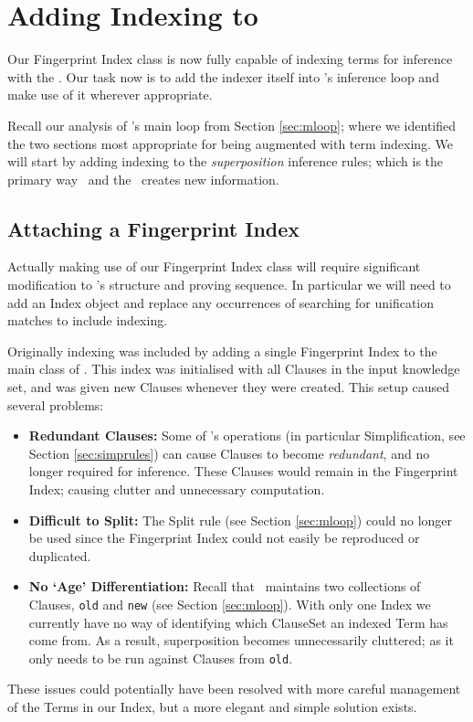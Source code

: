 \section{Adding Indexing to \Beagle}
Our Fingerprint Index class is now fully capable of indexing terms for inference
with the \HSWAC. Our task now is to add the indexer itself into \beagle's inference
loop and make use of it wherever appropriate.

Recall our analysis of \beagle's main loop from Section \ref{sec:mloop}; where we identified
the two sections most appropriate for being augmented with term indexing. We will
start by adding indexing to the \emph{superposition} inference rules; which is
the primary way \beagle\ and the \HSWAC\ creates new information.

\subsection{Attaching a Fingerprint Index}

Actually making use of our Fingerprint Index class will require significant modification
to \beagle's structure and proving sequence. In particular we will need
to add an Index object and replace any occurrences of searching for unification matches
to include indexing.

Originally indexing was included by adding a single Fingerprint Index to the main
class of \beagle. This index was initialised with all Clauses in the input knowledge set,
and was given new Clauses whenever they were created. This setup caused several
problems:
\begin{itemize}
\item \textbf{Redundant Clauses:} Some of \Beagle's operations (in particular Simplification, see Section \ref{sec:simprules})
can cause Clauses to become \emph{redundant}, and no longer required for inference.
These Clauses would remain in the Fingerprint Index; causing clutter and unnecessary
computation.
\item \textbf{Difficult to Split:} The Split rule (see Section \ref{sec:mloop})
could no longer be used since the Fingerprint Index could not easily be reproduced or
duplicated.
\item \textbf{No `Age' Differentiation:} Recall that \beagle\ maintains
two collections of Clauses, \verb!old! and \verb!new! (see Section \ref{sec:mloop}).
With only one Index we currently have no way of identifying which ClauseSet an indexed
Term has come from. As a result, superposition becomes unnecessarily cluttered;
as it only needs to be run against Clauses from \verb!old!.
\end{itemize}
These issues could potentially have been resolved with more careful management of
the Terms in our Index, but a more elegant and simple solution exists.


